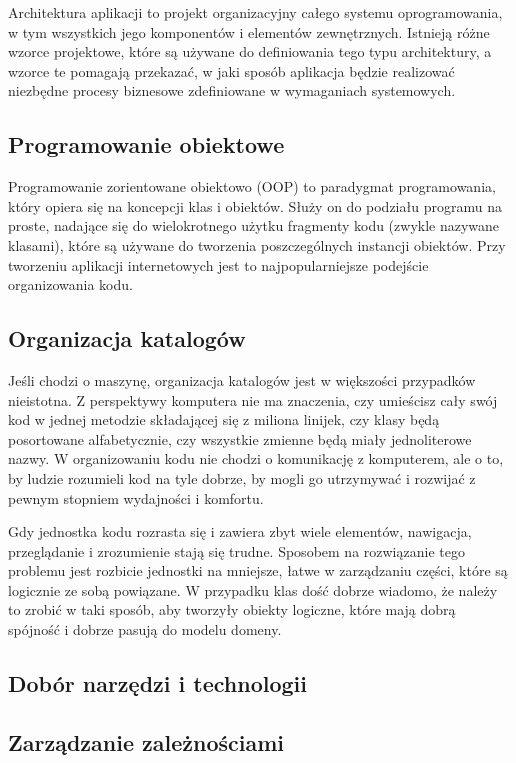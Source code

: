 Architektura aplikacji to projekt organizacyjny całego systemu oprogramowania, w tym wszystkich jego komponentów i elementów zewnętrznych. Istnieją różne wzorce projektowe, które są używane do definiowania tego typu architektury, a wzorce te pomagają przekazać, w jaki sposób aplikacja będzie realizować niezbędne procesy biznesowe zdefiniowane w wymaganiach systemowych.

\subsection{Programowanie obiektowe}

Programowanie zorientowane obiektowo (OOP) to paradygmat programowania, który opiera się na koncepcji klas i obiektów. Służy on do podziału programu na proste, nadające się do wielokrotnego użytku fragmenty kodu (zwykle nazywane klasami), które są używane do tworzenia poszczególnych instancji obiektów. Przy tworzeniu aplikacji internetowych jest to najpopularniejsze podejście organizowania kodu.

\subsection{Organizacja katalogów}

Jeśli chodzi o maszynę, organizacja katalogów jest w większości przypadków nieistotna. Z perspektywy komputera nie ma znaczenia, czy umieścisz cały swój kod w jednej metodzie składającej się z miliona linijek, czy klasy będą posortowane alfabetycznie, czy wszystkie zmienne będą miały jednoliterowe nazwy. W organizowaniu kodu nie chodzi o komunikację z komputerem, ale o to, by ludzie rozumieli kod na tyle dobrze, by mogli go utrzymywać i rozwijać z pewnym stopniem wydajności i komfortu.

Gdy jednostka kodu rozrasta się i zawiera zbyt wiele elementów, nawigacja, przeglądanie i zrozumienie stają się trudne. Sposobem na rozwiązanie tego problemu jest rozbicie jednostki na mniejsze, łatwe w zarządzaniu części, które są logicznie ze sobą powiązane. W przypadku klas dość dobrze wiadomo, że należy to zrobić w taki sposób, aby tworzyły obiekty logiczne, które mają dobrą spójność i dobrze pasują do modelu domeny. 

\subsection{Dobór narzędzi i technologii}

\subsection{Zarządzanie zależnościami}

